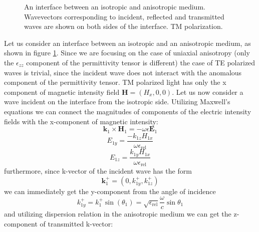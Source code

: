 \documentclass[a4paper]{scrartcl}
\begin{document}
\begin{figure}[b!]
\caption{An interface between an isotropic and anisotropic medium. Wavevectors corresponding to incident, reflected and transmitted waves are shown
on both sides of the interface. TM polarization.}
\label{Fig. 1}
\end{figure}
Let us consider an interface between an isotropic and an anisotropic medium, as shown in figure \ref{Fig. 1}. Since we
are focusing on the case of uniaxial anisotropy (only the $\epsilon_{zz}$ component of the permittivity tensor is
different) the case of TE polarized waves is trivial, since the incident wave does not interact with the anomalous
component of the permittivity tensor. TM polarized light has only the x component of magnetic intensity field
$\mathbf{H}=(H_x,0,0)$.
Let us now consider a wave incident on the interface from the isotropic side.
Utilizing Maxwell's equations we can connect the magnitudes of components of the electric intensity fields with the
x-component of magnetic intensity:
\begin{equation}
      \mathbf{k}_1 \times \mathbf{H}_1 = -\omega\epsilon\mathbf{E}_1
\end{equation}
\begin{equation}
      E_{1y} = \dfrac{-k_{1z} H_{1x}}{\omega \epsilon_\textrm{rel}}
\end{equation}
\begin{equation}
      E_{1z} = \dfrac{k_{1y} H_{1x}}{\omega \epsilon_\textrm{rel}}
\end{equation}
furthermore, since k-vector of the incident wave has the form
\begin{equation}
      \mathbf{k}_1^+ = (0,k_{1y}^+,k_{1z}^+)
\end{equation}
we can immediately get the y-component from the angle of incidence
\begin{equation}
      k_{1y}^+ = k_1^+ \sin(\theta_1) = \sqrt{\epsilon_\textrm{rel}}\dfrac{\omega}{c} \sin\theta_1
\end{equation}
and utilizing dispersion relation in the anisotropic medium we can get the z-component of transmitted k-vector:
\end{document}
